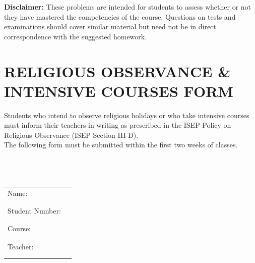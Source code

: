 \documentclass[10pt]{article}
\begin{document}
\begin{landscape}
\begin{longtable}[t]{||p{1.75in}|p{4.5in}|p{3.75in}||}
\end{longtable}
\noindent \textbf{Disclaimer:}  These problems are intended for students to assess whether or not they have mastered the competencies of the course.  Questions on tests and examinations should cover similar material but need not be in direct correspondence with the suggested homework.
\end{landscape}

\newpage
\vspace*{\fill}

\section*{RELIGIOUS OBSERVANCE \& INTENSIVE COURSES FORM}

Students who intend to observe religious holidays or who take intensive courses must inform their teachers in writing as prescribed in the ISEP Policy on Religious Observance (ISEP Section III-D). \\

The following form must be submitted within the first two weeks of classes. \\ \\ \\ \\

\begin{tabular}{@{}p{1.5in}p{5in}}
Name: & \underline{\hspace{5in}} \\ \\ \\
Student Number: & \underline{\hspace{5in}} \\ \\ \\
Course: & \underline{\hspace{5in}} \\ \\ \\
Teacher: & \underline{\hspace{5in}} \\ \\ \\
\end{tabular}

\vspace{0.5in}
\end{document}
